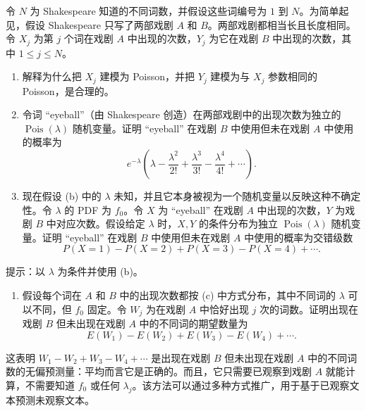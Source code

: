 \documentclass[UTF8, 12pt, fontset=fandol, oneside]{ctexart}
\begin{document}
令 $N$ 为 Shakespeare 知道的不同词数，并假设这些词编号为 $1$ 到 $N$。为简单起见，假设 Shakespeare 只写了两部戏剧 $A$ 和 $B$。两部戏剧都相当长且长度相同。令 $X_j$ 为第 $j$ 个词在戏剧 $A$ 中出现的次数，$Y_j$ 为它在戏剧 $B$ 中出现的次数，其中 $1\le j\le N$。
\begin{enumerate}
  \item[(a)] 解释为什么把 $X_j$ 建模为 Poisson，并把 $Y_j$ 建模为与 $X_j$ 参数相同的 Poisson，是合理的。
  \item[(b)] 令词 “eyeball”（由 Shakespeare 创造）在两部戏剧中的出现次数为独立的 $\operatorname{Pois}(\lambda)$ 随机变量。证明 “eyeball” 在戏剧 $B$ 中使用但未在戏剧 $A$ 中使用的概率为
  \[
    e^{-\lambda}\left(\lambda-\frac{\lambda^2}{2!}+\frac{\lambda^3}{3!}-\frac{\lambda^4}{4!}+\cdots\right).
  \]
  \item[(c)] 现在假设 (b) 中的 $\lambda$ 未知，并且它本身被视为一个随机变量以反映这种不确定性。令 $\lambda$ 的 PDF 为 $f_0$。令 $X$ 为 “eyeball” 在戏剧 $A$ 中出现的次数，$Y$ 为戏剧 $B$ 中对应次数。假设给定 $\lambda$ 时，$X,Y$ 的条件分布为独立 $\operatorname{Pois}(\lambda)$ 随机变量。证明 “eyeball” 在戏剧 $B$ 中使用但未在戏剧 $A$ 中使用的概率为交错级数
  \[
    P(X=1)-P(X=2)+P(X=3)-P(X=4)+\cdots.
  \]
\end{enumerate}
提示：以 $\lambda$ 为条件并使用 (b)。
\begin{enumerate}
  \item[(d)] 假设每个词在 $A$ 和 $B$ 中的出现次数都按 (c) 中方式分布，其中不同词的 $\lambda$ 可以不同，但 $f_0$ 固定。令 $W_j$ 为在戏剧 $A$ 中恰好出现 $j$ 次的词数。证明出现在戏剧 $B$ 但未出现在戏剧 $A$ 中的不同词的期望数量为
  \[
    E(W_1)-E(W_2)+E(W_3)-E(W_4)+\cdots.
  \]
\end{enumerate}
这表明 $W_1-W_2+W_3-W_4+\cdots$ 是出现在戏剧 $B$ 但未出现在戏剧 $A$ 中的不同词数的无偏预测量：平均而言它是正确的。而且，它只需要已观察到戏剧 $A$ 就能计算，不需要知道 $f_0$ 或任何 $\lambda_j$。该方法可以通过多种方式推广，用于基于已观察文本预测未观察文本。
\end{document}
